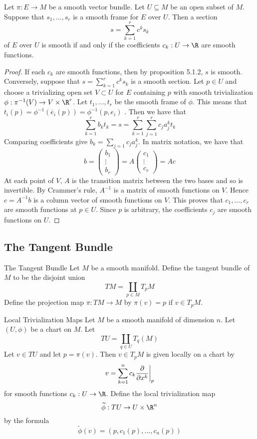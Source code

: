\documentclass[a4paper]{article}
\begin{document}
\begin{prp}{}{} Let $\pi:E\to M$ be a smooth vector bundle. Let $U\subseteq M$ be an open subset of $M$. Suppose that $s_1,\dots,s_r$ is a smooth frame for $E$ over $U$. Then a section $$s=\sum_{k=1}^rc^ks_k$$ of $E$ over $U$ is smooth if and only if the coefficients $c_k:U\to\R$ are smooth functions. \tcbline
\begin{proof}
If each $c_k$ are smooth functions, then by proposition 5.1.2, $s$ is smooth. Conversely, suppose that $s=\sum_{k=1}^rc^ks_k$ is a smooth section. Let $p\in U$ and choose a trivializing open set $V\subset U$ for $E$ containing $p$ with smooth trivialization $\phi:\pi^{-1}(V)\to V\times\R^r$. Let $t_1,\dots,t_r$ be the smooth frame of $\phi$. This means that $t_i(p)=\phi^{-1}(\overline{e}_i(p))=\phi^{-1}(p,e_i)$ . Then we have that $$\sum_{k=1}^rb_kt_k=s=\sum_{k=1}^r\sum_{j=1}^rc_ja_j^kt_k$$ Comparing coefficients give $b_k=\sum_{j=1}c_ja_j^k$. In matrix notation, we have that $$b=\begin{pmatrix}
b_1\\
\vdots\\
b_r
\end{pmatrix}=A\begin{pmatrix}
c_1\\
\vdots\\
c_r
\end{pmatrix}=Ac$$ At each point of $V$, $A$ is the transition matrix between the two bases and so is invertible. By Crammer's rule, $A^{-1}$ is a matrix of smooth functions on $V$. Hence $c=A^{-1}b$ is a column vector of smooth functions on $V$. This proves that $c_1,\dots,c_r$ are smooth functions at $p\in U$. Since $p$ is arbitrary, the coefficients $c_j$ are smooth functions on $U$. 
\end{proof}
\end{prp}

\subsection{The Tangent Bundle}
\begin{defn}{The Tangent Bundle}{} Let $M$ be a smooth manifold. Define the tangent bundle of $M$ to be the disjoint union $$TM=\coprod_{p\in M}T_pM$$ Define the projection map $\pi:TM\to M$ by $\pi(v)=p$ if $v\in T_pM$. 
\end{defn}

\begin{defn}{Local Trivialization Maps}{} Let $M$ be a smooth manifold of dimension $n$. Let $(U,\phi)$ be a chart on $M$. Let $$TU=\coprod_{q\in U}T_q(M)$$ Let $v\in TU$ and let $p=\pi(v)$. Then $v\in T_pM$ is given locally on a chart by $$v=\sum_{k=1}^n c_k\frac{\partial}{\partial x^k}\bigg{|}_p$$ for smooth functions $c_k:U\to\R$. Define the local trivialization map $$\widetilde{\phi}:TU\to U\times\R^n$$ by the formula $$\widetilde{\phi}(v)=(p,c_1(p),\dots,c_n(p))$$
\end{defn}
\end{document}
